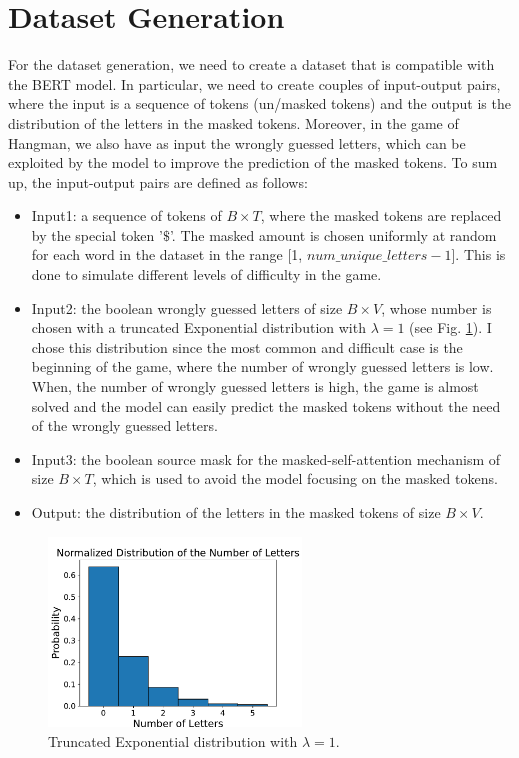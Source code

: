 \documentclass{report}
\begin{document}
\section*{Dataset Generation}
For the dataset generation, we need to create a dataset that is compatible with the \ac{BERT} model.
In particular, we need to create couples of input-output pairs, where the input is a sequence of tokens (un/masked tokens)
and the output is the distribution of the letters in the masked tokens.
Moreover, in the game of Hangman, we also have as input the wrongly guessed letters, 
which can be exploited by the model to improve the prediction of the masked tokens.
To sum up, the input-output pairs are defined as follows:
\begin{itemize}
    \item Input1: a sequence of tokens of $B \times T$, where the masked tokens are replaced by the special token '$\$$'. 
    The masked amount is chosen uniformly at random for each word in the dataset in the range [1, ${num\_unique\_letters - 1}$]. 
    This is done to simulate different levels of difficulty in the game.
    \item Input2: the boolean wrongly guessed letters of size $B \times V$, whose number is chosen with a truncated Exponential distribution with $\lambda = 1$ (see Fig. \ref{fig:fig2}).
    I chose this distribution since the most common and difficult case is the beginning of the game, where the number of wrongly guessed letters is low.
    When, the number of wrongly guessed letters is high, the game is almost solved and the model can easily predict the masked tokens without the need of the wrongly guessed letters.
    \item Input3: the boolean source mask for the masked-self-attention mechanism of size $B \times T$, which is used to avoid the model focusing on the masked tokens.
    \item Output: the distribution of the letters in the masked tokens of size $B \times V$.
\end{itemize}

\begin{figure}[!h]
    \centering
    \includegraphics[width=0.6\textwidth]{figures/Figure_2.pdf}
    \caption{Truncated Exponential distribution with $\lambda = 1$.}
    \label{fig:fig2}
\end{figure}
\end{document}
